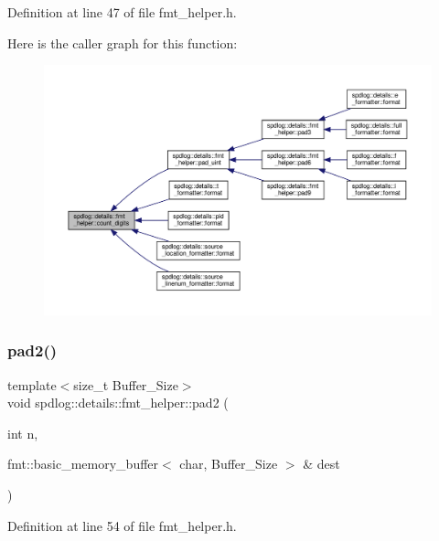 Definition at line 47 of file fmt\+\_\+helper.\+h.

Here is the caller graph for this function\+:
\nopagebreak
\begin{figure}[H]
\begin{center}
\leavevmode
\includegraphics[width=350pt]{namespacespdlog_1_1details_1_1fmt__helper_a976eeb3c4a42ccfb05437aa9a0d4d9f7_icgraph}
\end{center}
\end{figure}
\mbox{\label{namespacespdlog_1_1details_1_1fmt__helper_ae8d7b70c5b54338c0903cf494b06404a}} 
\subsubsection{\texorpdfstring{pad2()}{pad2()}}
{\footnotesize\ttfamily template$<$size\+\_\+t Buffer\+\_\+\+Size$>$ \\
void spdlog\+::details\+::fmt\+\_\+helper\+::pad2 (\begin{DoxyParamCaption}\item[{int}]{n,  }\item[{fmt\+::basic\+\_\+memory\+\_\+buffer$<$ char, Buffer\+\_\+\+Size $>$ \&}]{dest }\end{DoxyParamCaption})\hspace{0.3cm}{\ttfamily [inline]}}



Definition at line 54 of file fmt\+\_\+helper.\+h.

